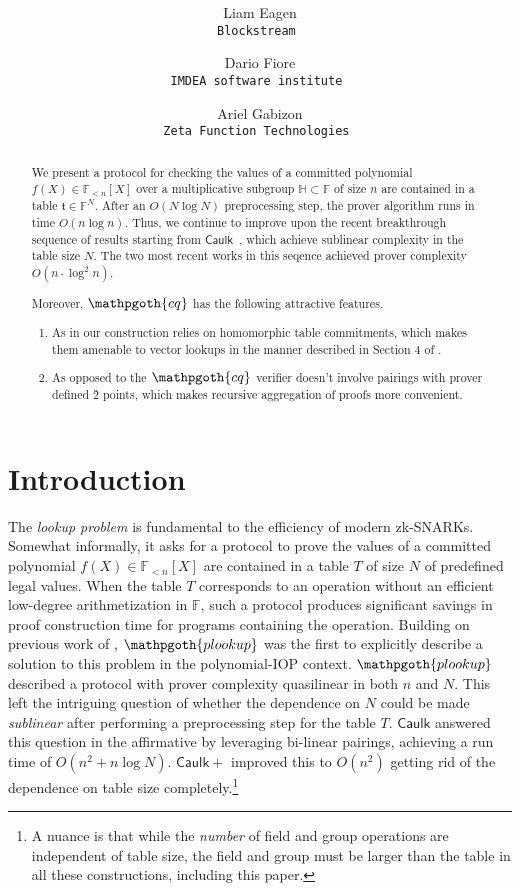 \documentclass[11pt]{article} %
\title{ \bf \papertitle \\[0.72cm]}
\author{ Liam Eagen \\ \tt{Blockstream} \and  Dario Fiore \\ \tt{IMDEA software institute}  \and Ariel Gabizon \\ \tt{Zeta Function Technologies} }
\newcommand{\cq}{\ensuremath{\mathpgoth{cq} }\xspace}
\newcommand{\caulkp}{\ensuremath{\mathsf{\mathrel{Caulk}\mathrel{\scriptstyle{+}}}}\xspace}
\newcommand{\caulk}{\ensuremath{\mathsf{Caulk}}\xspace}
\newcommand{\plookup}{\ensuremath{\mathpgoth{plookup}}\xspace}
\newcommand{\F}{\ensuremath{\mathbb F}\xspace}
\newcommand{\polysofdeg}[1]{\ensuremath{\F_{< #1}[X]}\xspace}
\newcommand{\subspace}{\ensuremath{\mathbb{H}}\xspace}
\newcommand{\witsize}{\ensuremath{n}\xspace}
\newcommand{\tabsize}{\ensuremath{N}\xspace}
\newcommand{\tab}{\ensuremath{\mathfrak{t}}\xspace}
\begin{document}
    \maketitle
\begin{abstract}
 We present a protocol for checking the values of a committed polynomial $f(X)\in \polysofdeg{\witsize}$ over a multiplicative subgroup $\subspace\subset \F$ of size \witsize are contained in a
 table $\tab\in \F^\tabsize$. After an $O(\tabsize \log \tabsize)$ preprocessing step, the prover algorithm runs in time $O(\witsize\log \witsize)$.
 Thus, we continue to improve upon the recent breakthrough sequence of results\cite{caulk,caulkp,flookup,baloo} starting from \caulk~\cite{caulk}, which achieve sublinear complexity in the table size \tabsize. The two most recent works in this seqence \cite{flookup,baloo} achieved
 prover complexity $O(\witsize\cdot \log^2 \witsize)$.
 
 Moreover, \cq has the following attractive features.
 \begin{enumerate}
  \item As in \cite{caulk,caulkp,baloo} our construction relies on homomorphic table commitments, which makes them amenable to vector lookups in the manner described in Section 4 of \cite{plookup}.
 \item As opposed to \cite{caulk,caulkp,flookup,baloo} the \cq verifier doesn't involve pairings with prover defined \G2 points, which makes recursive aggregation of proofs more convenient.
 \end{enumerate}
 \end{abstract}


\section{Introduction}
The \emph{lookup problem} is fundamental to the efficiency of modern zk-SNARKs.
Somewhat informally, it asks for a protocol to prove the values of a committed polynomial $f(X)\in\polysofdeg{\witsize}$ are contained in a table $T$ of size $\tabsize$ of predefined legal values.
When the table $T$ corresponds to an operation without an efficient low-degree arithmetization in $\F$, such a protocol produces significant savings in proof construction time for programs containing the operation.
Building on previous work of \cite{arya}, \plookup \cite{plookup} was the first to explicitly describe a solution to this problem in the polynomial-IOP context. \plookup described a protocol with prover complexity quasilinear in both \witsize and \tabsize.
This left the intriguing question of whether the dependence on \tabsize could be made \emph{sublinear} after performing a preprocessing step for the table $T$.
\caulk \cite{caulk} answered this question in the affirmative by leveraging bi-linear pairings, achieving a run time of $O(\witsize^2+\witsize\log \tabsize)$. \caulkp \cite{caulkp} improved this to $O(\witsize^2)$ getting rid of the dependence on table size completely.\footnote{A nuance is that while the \emph{number} of field and group operations are independent of table size, the field and group must be larger than the table in all these constructions, including this paper.} 
\end{document}
